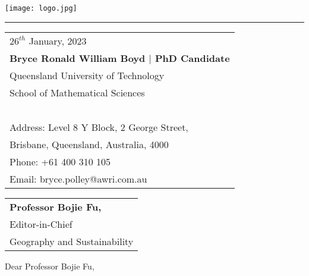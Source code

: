 \documentclass{article}
\begin{document}

\texttt{[image: logo.jpg]} %

\vspace{-1em} %

\rule{\linewidth}{1pt} %

\bigskip\bigskip %


\hfill
\begin{tabular}{l @{}}
	$26^{th}$ January, 2023\\ %
	\textbf{Bryce Ronald William Boyd $|$ PhD Candidate}\\
	Queensland University of Technology \\
	School of Mathematical Sciences\\~\\
	Address: Level 8 Y Block, 2 George Street, \\
	Brisbane, Queensland, Australia, 4000\\
	Phone: +61 400 310 105 \\
	Email: bryce.polley@awri.com.au
\end{tabular}

\bigskip %


\begin{tabular}{@{} l}
	\textbf{Professor Bojie Fu,}\\
	Editor-in-Chief \\
	Geography and Sustainability\\
\end{tabular}

\bigskip %

Dear Professor Bojie Fu,
\\~\\
\parskip %
\end{document}
